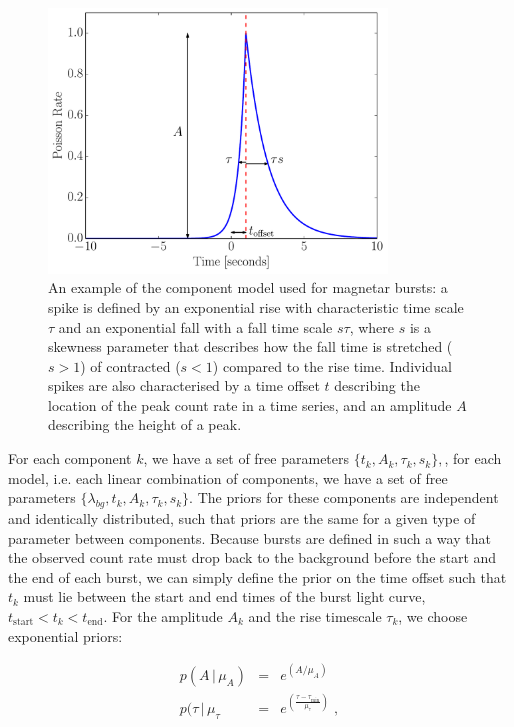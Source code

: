 \documentclass[12pt]{emulateapj}
\newcommand{\given}{\,|\,}
\newcommand{\mean}{\lambda}
\begin{document}
\begin{figure}[h]
\begin{center}
\includegraphics[width=9cm]{word.pdf}
\caption{An example of the component model used for magnetar bursts: a spike is defined by an exponential rise with characteristic
time scale $\tau$ and an exponential fall with a fall time scale $s\tau$, where $s$ is a skewness parameter that describes how the fall
time is stretched ($s > 1$) of contracted ($s < 1$) compared to the rise time. Individual spikes are also characterised by a time offset
$t$ describing the location of the peak count rate in a time series, and an amplitude $A$ describing the height of a peak.}
\label{fig:dnest_example}
\end{center}
\end{figure}


For each component $k$, we have a set of free parameters $\{t_k, A_k, \tau_k, s_k \},$, for each model, i.e. each
linear combination of components, we have a set of free parameters $\{\mean_{bg}, {t_k, A_k, \tau_k, s_k} \}$.
The priors for these components are independent and identically distributed, such that priors are the same for
a given type of parameter between components. 
Because bursts are defined in such a way that the observed count rate must drop back to the background before the
start and the end of each burst, we can simply define the prior on the time offset such that $t_k$ must lie between
the start and end times of the burst light curve, $t_{\mathrm{start}} < t_k < t_\mathrm{end}$. 
For the amplitude $A_k$ and the rise timescale $\tau_k$, we choose exponential priors:

\begin{eqnarray}
p(A \given \mu_A) &=& e^{(A/\mu_A)} \\
p(\tau \given \mu_{\tau} & = & e^{(\frac{\tau - \tau_{\mathrm{min}}}{\mu_{\mathrm{\tau}}})} \; ,
\end{eqnarray}
\end{document}
